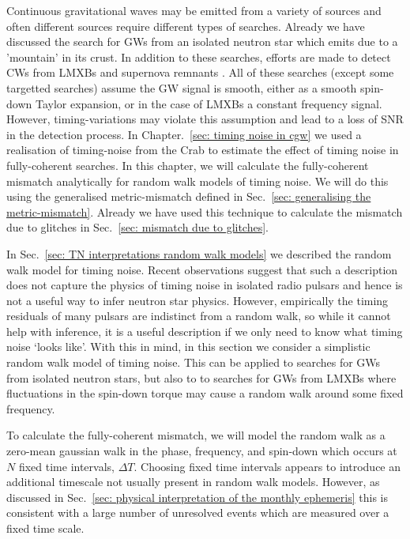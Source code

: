 \documentclass[../full_thesis/full_thesis.tex]{subfiles}
\begin{document}
Continuous gravitational waves may be emitted from a variety of sources and
often different sources require different types of searches.  Already we have
discussed the search for GWs from an isolated neutron star which emits due to a
'mountain' in its crust. In addition to these searches, efforts are made to
detect CWs from LMXBs \citep{ligo2015scox1} and supernova remnants
\citep{ligo_SNR2015}. All of these searches (except some targetted searches)
assume the GW signal is smooth, either as a smooth spin-down Taylor expansion,
or in the case of LMXBs a constant frequency signal. However, timing-variations
may violate this assumption and lead to a loss of SNR in the detection process.
In Chapter.~\ref{sec: timing noise in cgw} we used a realisation of
timing-noise from the Crab to estimate the effect of timing noise in
fully-coherent searches. In this chapter, we will calculate the fully-coherent mismatch
analytically for random walk models of timing noise. We will do this using the
generalised metric-mismatch defined in Sec.~\ref{sec: generalising the
metric-mismatch}. Already we have used this technique to calculate the mismatch
due to glitches in Sec.~\eqref{sec: mismatch due to glitches}. 

In Sec.~\ref{sec: TN interpretations random walk models} we described the
random walk model for timing noise. Recent observations \citep{Hobbs2010}
suggest that such a description does not capture the physics of timing noise in
isolated radio pulsars and hence is not a useful way to infer neutron star
physics. However, empirically the timing residuals of many pulsars are
indistinct from a random walk, so while it cannot help with inference, it is a
useful description if we only need to know what timing noise `looks like'. With
this in mind, in this section we consider a simplistic random walk model of
timing noise. This can be applied to searches for GWs from isolated neutron
stars, but also to to searches for GWs from LMXBs where fluctuations in the
spin-down torque may cause a random walk around some fixed frequency.

To calculate the fully-coherent mismatch, we will model the random walk as a zero-mean
gaussian walk in the phase, frequency, and spin-down which occurs at $N$ fixed
time intervals, $\Delta T$. Choosing fixed time intervals appears to introduce
an additional timescale not usually present in random walk models. However, as
discussed in Sec.~\ref{sec: physical interpretation of the monthly
ephemeris} this is consistent with a large number of unresolved events which
are measured over a fixed time scale.
\end{document}

